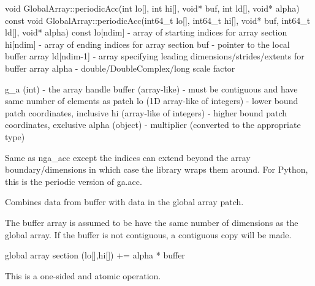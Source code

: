 \documentclass[12pt]{article}
\begin{document}
\begin{cxxapi}
void GlobalArray::periodicAcc(int lo[], int hi[], void* buf,
                              int ld[], void* alpha) const
void GlobalArray::periodicAcc(int64_t lo[], int64_t hi[], void* buf,
                              int64_t ld[], void* alpha) const
   lo[ndim]   - array of starting indices for array section               \access{[input]}
   hi[ndim]   - array of ending indices for array section                 \access{[input]}
   buf        - pointer to the local buffer array                         \access{[input]}
   ld[ndim-1] - array specifying leading dimensions/strides/extents
                for buffer array                                          \access{[input]}
   alpha      - double/DoubleComplex/long scale factor                    \access{[input]}
\end{cxxapi}

\begin{pyapi}
   g_a (int)                      - the array handle
   buffer (array-like)            - must be contiguous and have same 
                                    number of elements as patch
   lo (1D array-like of integers) - lower bound patch coordinates, inclusive
   hi (array-like of integers)    - higher bound patch coordinates, exclusive
   alpha (object)                 - multiplier (converted to the
                                    appropriate type)
\end{pyapi}

\begin{desc}

Same as nga_acc except the indices can extend beyond the array boundary/dimensions 
in which case the library wraps them around. For Python, this is the periodic 
version of ga.acc.

Combines data from buffer with data in the global array patch.

The buffer array is assumed to be have the same number of dimensions as the 
global array. If the buffer is not contiguous, a contiguous copy will be made.

global array section (lo[],hi[]) += alpha * buffer

This is a one-sided and atomic operation.

\end{desc}

\end{document}
